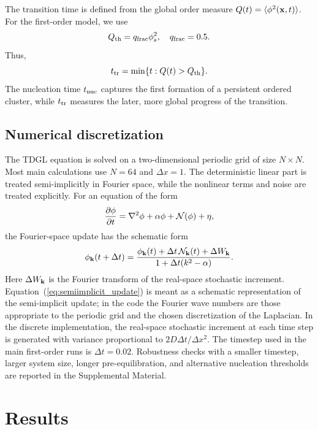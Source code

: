 ﻿\documentclass[aps,pre,preprint,showkeys,amsmath,amssymb,superscriptaddress,longbibliography]{revtex4-2}
\begin{document}
The transition time is defined from the global order measure $Q(t)=\langle \phi^2({\bf x},t)\rangle$. For the first-order model, we use
\begin{equation}
Q_{\rm th}=q_{\rm frac}\phi_s^2,
\quad q_{\rm frac}=0.5.
\end{equation}
Thus,
\begin{equation}
t_{\rm tr}=\min\{t:Q(t)>Q_{\rm th}\}.
\end{equation}
The nucleation time $t_{\rm nuc}$ captures the first formation of a persistent ordered cluster, while $t_{\rm tr}$ measures the later, more global progress of the transition.

\subsection{Numerical discretization}\label{numerical-discretization}

The TDGL equation is solved on a two-dimensional periodic grid of size $N\times N$. Most main calculations use $N=64$ and $\Delta x=1$. The deterministic linear part is treated semi-implicitly in Fourier space, while the nonlinear terms and noise are treated explicitly. For an equation of the form
\begin{equation}
\frac{\partial \phi}{\partial t}=\nabla^2\phi+\alpha\phi+{\cal N}(\phi)+\eta,
\end{equation}
the Fourier-space update has the schematic form
\begin{equation}
\phi_{\bf k}(t+\Delta t)=\frac{\phi_{\bf k}(t)+\Delta t\,{\cal N}_{\bf k}(t)+\Delta W_{\bf k}}{1+\Delta t(k^2-\alpha)}.
\label{eq:semiimplicit_update}
\end{equation}
Here $\Delta W_{\bf k}$ is the Fourier transform of the real-space stochastic increment. Equation~(\ref{eq:semiimplicit_update}) is meant as a schematic representation of the semi-implicit update; in the code the Fourier wave numbers are those appropriate to the periodic grid and the chosen discretization of the Laplacian. In the discrete implementation, the real-space stochastic increment at each time step is generated with variance proportional to $2D\Delta t/\Delta x^2$. The timestep used in the main first-order runs is $\Delta t=0.02$. Robustness checks with a smaller timestep, larger system size, longer pre-equilibration, and alternative nucleation thresholds are reported in the Supplemental Material.

\section{Results}\label{results}
\end{document}
